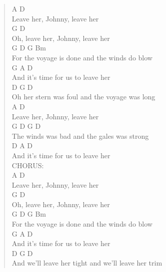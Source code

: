 \documentclass[11pt]{article}
\begin{document}
\begin{verse}
A                  D\\
Leave her, Johnny, leave her\\
\hspace*{4em}G                  D\\
Oh, leave her, Johnny, leave her\\
\hspace*{8em}G         D            G        Bm\\
For the voyage is done and the winds do blow\\
\hspace*{9em}G        A     D\\
And it's time for us to leave her\\
\vspace*{1em}
\vspace*{1em}
D                             G          D\\
Oh her stern was foul and the voyage was long\\
A                  D\\
Leave her, Johnny, leave her\\
\hspace*{6em}G       D           G         D\\
The winds was bad and the gales was strong\\
\hspace*{9em}D        A     D\\
And it's time for us to leave her\\
\vspace*{1em}
CHORUS:\\
A                  D\\
Leave her, Johnny, leave her\\
\hspace*{4em}G                  D\\
Oh, leave her, Johnny, leave her\\
\hspace*{8em}G         D            G        Bm\\
For the voyage is done and the winds do blow\\
\hspace*{9em}G        A     D\\
And it's time for us to leave her\\
\vspace*{1em}
\vspace*{1em}
D                                   G       D\\
And we'll leave her tight and we'll leave her trim\\

\end{verse}
\end{document}
